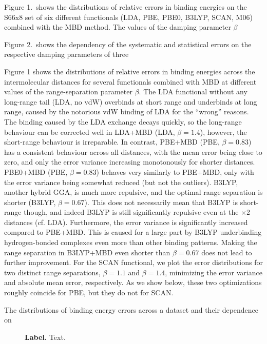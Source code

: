 Figure 1.\ shows the distributions of relative errors in binding energies on the S66x8 set of six different functionals (LDA, PBE, PBE0, B3LYP, SCAN, M06) combined with the MBD method.
The values of the damping parameter $\beta$ 

Figure 2.\ shows the dependency of the systematic and statistical errors on the respective damping parameters of three 

Figure 1 shows the distributions of relative errors in binding energies across the intermolecular distances for several functionals combined with MBD at different values of the range-separation parameter $\beta$.
The LDA functional without any long-range tail (LDA, no vdW) overbinds at short range and underbinds at long range, caused by the notorious vdW binding of LDA for the ``wrong'' reasons.
The binding caused by the LDA exchange decays quickly, so the long-range behaviour can be corrected well in LDA+MBD (LDA, $\beta=1.4$), however, the short-range behaviour is irreparable.
In contrast, PBE+MBD (PBE, $\beta=0.83$) has a consistent behaviour across all distances, with the mean error being close to zero, and only the error variance increasing monotonously for shorter distances.
PBE0+MBD (PBE, $\beta=0.83$) behaves very similarly to PBE+MBD, only with the error variance being somewhat reduced (but not the outliers).
B3LYP, another hybrid GGA, is much more repulsive, and the optimal range separation is shorter (B3LYP, $\beta=0.67$).
This does not necessarily mean that B3LYP is short-range though, and indeed B3LYP is still significantly repulsive even at the $\times$2 distances (cf. LDA).
Furthermore, the error variance is significantly increased compared to PBE+MBD\@.
This is caused for a large part by B3LYP underbinding hydrogen-bonded complexes even more than other binding patterns.
Making the range separation in B3LYP+MBD even shorter than $\beta=0.67$ does not lead to further improvement.
For the SCAN functional, we plot the error distributions for two distinct range separations, $\beta=1.1$ and $\beta=1.4$, minimizing the error variance and absolute mean error, respectively.
As we show below, these two optimizations roughly coincide for PBE, but they do not for SCAN\@.

The distributions of binding energy errors across a dataset and their dependence on 

\begin{figure}
\caption{\textbf{Label.}
Text.
\label{fig:s66-dists}
}
\end{figure}

